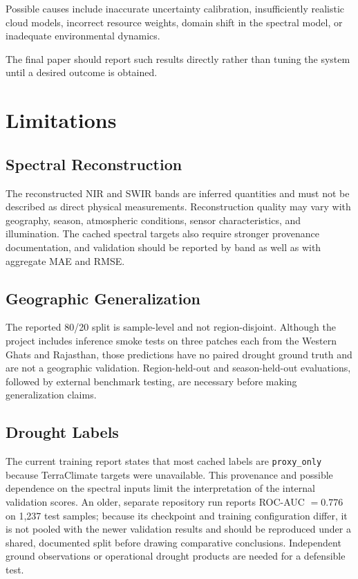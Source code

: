 \documentclass[11pt,a4paper]{article}
\begin{document}
Possible causes include inaccurate uncertainty calibration,
insufficiently realistic cloud models, incorrect resource weights,
domain shift in the spectral model, or inadequate environmental
dynamics.

The final paper should report such results directly rather than tuning
the system until a desired outcome is obtained.


\section{Limitations}

\subsection{Spectral Reconstruction}

The reconstructed NIR and SWIR bands are inferred quantities and must
not be described as direct physical measurements. Reconstruction
quality may vary with geography, season, atmospheric conditions,
sensor characteristics, and illumination. The cached spectral targets
also require stronger provenance documentation, and validation should
be reported by band as well as with aggregate MAE and RMSE.

\subsection{Geographic Generalization}

The reported 80/20 split is sample-level and not region-disjoint.
Although the project includes inference smoke tests on three patches
each from the Western Ghats and Rajasthan, those predictions have no
paired drought ground truth and are not a geographic validation.
Region-held-out and season-held-out evaluations, followed by external
benchmark testing, are necessary before making generalization claims.

\subsection{Drought Labels}

The current training report states that most cached labels are
\texttt{proxy\_only} because TerraClimate targets were unavailable.
This provenance and possible dependence on the spectral inputs limit
the interpretation of the internal validation scores. An older,
separate repository run reports ROC-AUC $=0.776$ on 1,237 test
samples; because its checkpoint and training configuration differ,
it is not pooled with the newer validation results and should be
reproduced under a shared, documented split before drawing
comparative conclusions. Independent ground observations or
operational drought products are needed for a defensible test.
\end{document}
